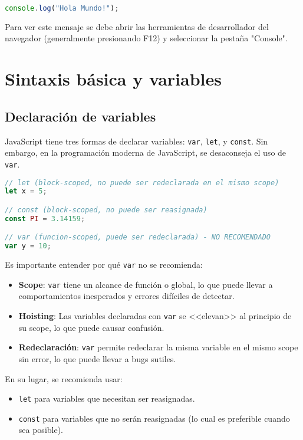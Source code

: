 \documentclass{book}
\begin{document}
\begin{lstlisting}[language=JavaScript, caption=Hola mundo con console.log]
console.log("Hola Mundo!");
\end{lstlisting}

Para ver este mensaje se debe abrir las herramientas de desarrollador del navegador (generalmente presionando F12) y seleccionar la pestaña "Console".

\section{Sintaxis básica y variables}

\subsection{Declaración de variables}
JavaScript tiene tres formas de declarar variables: \texttt{var}, \texttt{let}, y \texttt{const}. Sin embargo, en la programación moderna de JavaScript, se desaconseja el uso de \texttt{var}.

\begin{lstlisting}[language=JavaScript, caption=Variables]
// let (block-scoped, no puede ser redeclarada en el mismo scope)
let x = 5;

// const (block-scoped, no puede ser reasignada)
const PI = 3.14159;

// var (funcion-scoped, puede ser redeclarada) - NO RECOMENDADO
var y = 10;
\end{lstlisting}

Es importante entender por qué \texttt{var} no se recomienda:

\begin{itemize}
    \item \textbf{Scope}: \texttt{var} tiene un alcance de función o global, lo que puede llevar a comportamientos inesperados y errores difíciles de detectar.
    \item \textbf{Hoisting}: Las variables declaradas con \texttt{var} se <<elevan>> al principio de su scope, lo que puede causar confusión.
    \item \textbf{Redeclaración}: \texttt{var} permite redeclarar la misma variable en el mismo scope sin error, lo que puede llevar a bugs sutiles.
\end{itemize}

En su lugar, se recomienda usar:

\begin{itemize}
    \item \texttt{let} para variables que necesitan ser reasignadas.
    \item \texttt{const} para variables que no serán reasignadas (lo cual es preferible cuando sea posible).
\end{itemize}
\end{document}
